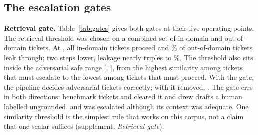 \documentclass[conference,a4paper]{IEEEtran}
\begin{document}
\subsection{The escalation gates}
\label{sec:gates}
\textbf{Retrieval gate.} Table~\ref{tab:gates} gives both gates at their live operating points. The retrieval threshold was chosen on a combined set of in-domain and out-of-domain tickets. At , all  in-domain tickets proceed and \% of out-of-domain tickets leak through; two steps lower, leakage nearly triples to \%. The threshold also sits inside the adversarial safe range [, ], from the highest similarity among tickets that must escalate to the lowest among tickets that must proceed. With the gate, the pipeline decides  adversarial tickets correctly; with it removed, . The gate errs in both directions: benchmark tickets  and  cleared it and drew drafts a human labelled ungrounded, and  was escalated although its context was adequate. One similarity threshold is the simplest rule that works on this corpus, not a claim that one scalar suffices (supplement, \emph{Retrieval gate}).
\end{document}
